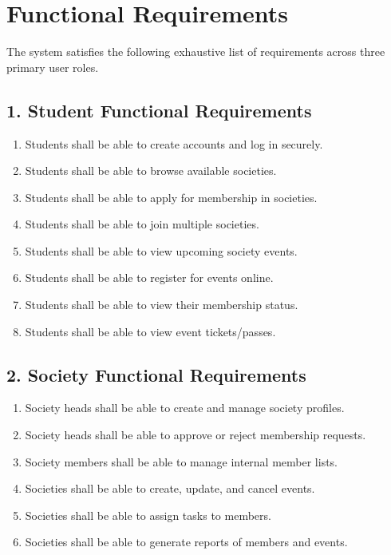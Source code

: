 \documentclass[12pt,a4paper]{article}
\begin{document}
\section{Functional Requirements}
The system satisfies the following exhaustive list of requirements across three primary user roles.

\subsection{1. Student Functional Requirements}
\begin{enumerate}
    \item Students shall be able to create accounts and log in securely.
    \item Students shall be able to browse available societies.
    \item Students shall be able to apply for membership in societies.
    \item Students shall be able to join multiple societies.
    \item Students shall be able to view upcoming society events.
    \item Students shall be able to register for events online.
    \item Students shall be able to view their membership status.
    \item Students shall be able to view event tickets/passes.
\end{enumerate}

\subsection{2. Society Functional Requirements}
\begin{enumerate}
    \item Society heads shall be able to create and manage society profiles.
    \item Society heads shall be able to approve or reject membership requests.
    \item Society members shall be able to manage internal member lists.
    \item Societies shall be able to create, update, and cancel events.
    \item Societies shall be able to assign tasks to members.
    \item Societies shall be able to generate reports of members and events.
\end{enumerate}
\end{document}
